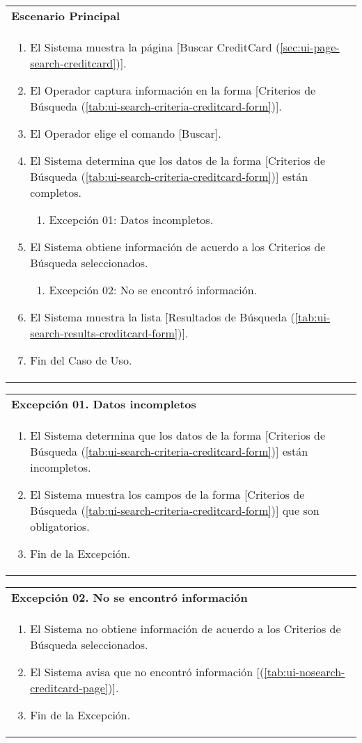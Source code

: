 	\begin{tabular}{ p{15.5cm} }
		\textbf{Escenario Principal} \\
		\begin{enumerate}
			\item El Sistema muestra la p\'agina [Buscar CreditCard (\ref{sec:ui-page-search-creditcard})].
			\item El Operador captura informaci\'on en la forma [Criterios de B\'usqueda (\ref{tab:ui-search-criteria-creditcard-form})].
			\item El Operador elige el comando [Buscar].
			\item El Sistema determina que los datos de la forma [Criterios de B\'usqueda (\ref{tab:ui-search-criteria-creditcard-form})] est\'an completos.
				\begin{enumerate}
					\item Excepci\'on 01: Datos incompletos.
				\end{enumerate}
			\item El Sistema obtiene informaci\'on de acuerdo a los Criterios de B\'usqueda seleccionados.
				\begin{enumerate}
					\item Excepci\'on 02: No se encontr\'o informaci\'on.
				\end{enumerate}
			\item El Sistema muestra la lista [Resultados de B\'usqueda (\ref{tab:ui-search-results-creditcard-form})].
			\item Fin del Caso de Uso.
		\end{enumerate}
	\end{tabular}
	
	\begin{tabular}{ p{15.5cm} }
		\textbf{Excepci\'on 01. Datos incompletos} \\
		\begin{enumerate}
			\item El Sistema determina que los datos de la forma [Criterios de B\'usqueda (\ref{tab:ui-search-criteria-creditcard-form})] est\'an incompletos.
			\item El Sistema muestra los campos de la forma [Criterios de B\'usqueda (\ref{tab:ui-search-criteria-creditcard-form})] que son obligatorios.
			\item Fin de la Excepci\'on.
		\end{enumerate}
	\end{tabular}
	
	\begin{tabular}{ p{15.5cm} }
		\textbf{Excepci\'on 02. No se encontr\'o informaci\'on} \\
		\begin{enumerate}
			\item El Sistema no obtiene informaci\'on de acuerdo a los Criterios de B\'usqueda seleccionados.
			\item El Sistema avisa que no encontr\'o informaci\'on [(\ref{tab:ui-nosearch-creditcard-page})].
			\item Fin de la Excepci\'on.
		\end{enumerate}
	\end{tabular}
	
